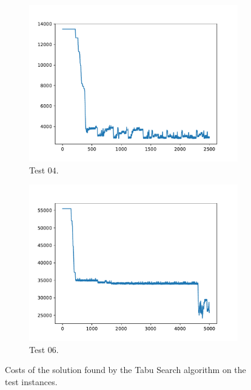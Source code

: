 \begin{figure}[h!]
\begin{subfigure}{0.45\textwidth}
        \includegraphics[width=\textwidth]{../logs/test04.pdf}
        \caption{Test $04$.}
    \end{subfigure}
    \begin{subfigure}{0.45\textwidth}
        \includegraphics[width=\textwidth]{../logs/test06.pdf}
        \caption{Test $06$.}
    \end{subfigure}
    \caption{Costs of the solution found by the Tabu Search algorithm on the test instances.}
    \label{fig:plot}
\end{figure}